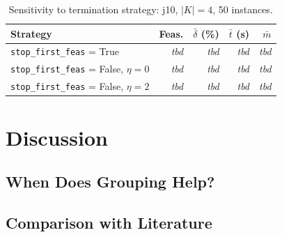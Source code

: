 \begin{table}[htbp]
\centering
\renewcommand{\arraystretch}{1.35}
\caption{Sensitivity to termination strategy:
         j10, $|K|=4$, 50 instances.}
\label{tab:sens_termination}
\begin{tabular}{l r r r r}
\hline
\textbf{Strategy} &
\textbf{Feas.} &
$\bar{\delta}$ (\%) &
$\bar{t}$ (s) &
$\bar{m}$ \\
\hline
\texttt{stop\_first\_feas} = True
    & \textit{tbd} & \textit{tbd}
    & \textit{tbd} & \textit{tbd} \\
\texttt{stop\_first\_feas} = False, $\eta=0$
    & \textit{tbd} & \textit{tbd}
    & \textit{tbd} & \textit{tbd} \\
\texttt{stop\_first\_feas} = False, $\eta=2$
    & \textit{tbd} & \textit{tbd}
    & \textit{tbd} & \textit{tbd} \\
\hline
\end{tabular}
\end{table}



\section{Discussion}
\label{sec:discussion}

\subsection{When Does Grouping Help?}
\label{subsec:when_grouping}



\subsection{Comparison with Literature}
\label{subsec:comparison_literature}

